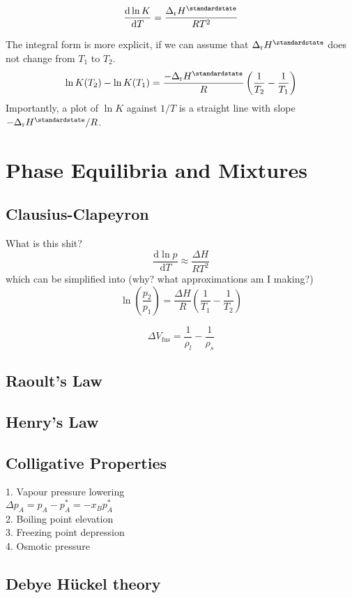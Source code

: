 \begin{equation*}
    \odv{\ln K}{T} = \frac{\Delta_{\mathrm{r}}H^\standardstate}{RT^2}
\end{equation*}

The integral form is more explicit, if we can assume that $\Delta_{\mathrm{r}}H^\standardstate$ does not change from $T_1$ to $T_2$.
\begin{equation*}
    \ln K (T_2) - \ln K (T_1) = \frac{-\Delta_{\mathrm{r}}H^\standardstate}{R} \left(\frac{1}{T_2} - \frac{1}{T_1}\right)
\end{equation*}
Importantly, a plot of $\ln K$ against $1/T$ is a straight line with slope $-\Delta_{\mathrm{r}}H^\standardstate / R$.

\section{Phase Equilibria and Mixtures}

\subsection*{Clausius-Clapeyron}
What is this shit?
\begin{equation*}
    \frac{\mathrm{d}\ln p}{\mathrm{d}T} \approx \frac{\Delta H}{RT^2}
\end{equation*}
which can be simplified into (why? what approximations am I making?)
\begin{equation*}
    \ln\left(\frac{p_2}{p_1}\right) = \frac{\Delta H}{R}\left(\frac{1}{T_1} - \frac{1}{T_2}\right)
\end{equation*}

\begin{equation*}
    \Delta V_{\mathrm{fus}} = \frac{1}{\rho_l} - \frac{1}{\rho_s}
\end{equation*}

\subsection*{Raoult's Law}

\subsection*{Henry's Law}

\subsection*{Colligative Properties}
1. Vapour pressure lowering \\
$\Delta p_A = p_A - p^{*}_{A} = -x_B p^*_A$ \\
2. Boiling point elevation \\
3. Freezing point depression \\
4. Osmotic pressure \\

\subsection*{Debye H\"uckel theory}



 